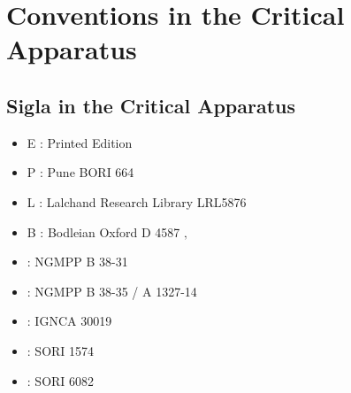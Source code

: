 \chapter{Conventions in the Critical Apparatus}
\section{Sigla in the Critical Apparatus}

\begin{itemize}
\item E : Printed Edition
\item P : Pune BORI 664
\item L : Lalchand Research Library LRL5876
\item B : Bodleian Oxford D 4587
‚\item \None : NGMPP B 38-31
\item \Ntwo : NGMPP B 38-35 / A 1327-14
\item \Done : IGNCA 30019
\item \Uone : SORI 1574
\item \Utwo : SORI 6082
\end{itemize}

